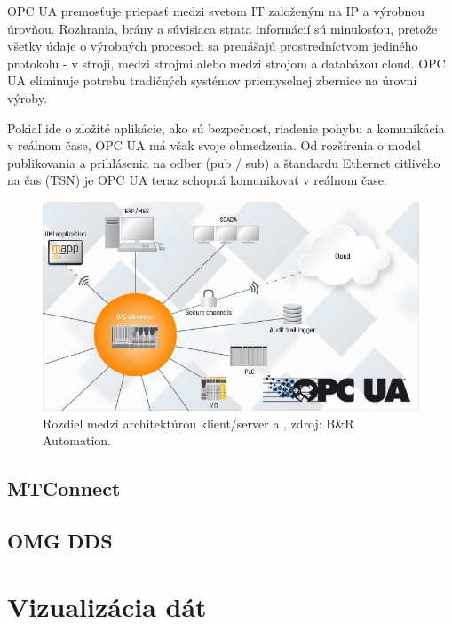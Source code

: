 \documentclass[]{tukediphc}
\begin{document}
OPC UA premosťuje priepasť medzi svetom IT založeným na IP a výrobnou úrovňou. Rozhrania, brány a súvisiaca strata informácií sú minulosťou, pretože všetky údaje o výrobných procesoch sa prenášajú prostredníctvom jediného protokolu - v stroji, medzi strojmi alebo medzi strojom a databázou cloud. OPC UA eliminuje potrebu tradičných systémov priemyselnej zbernice na úrovni výroby.


Pokiaľ ide o zložité aplikácie, ako sú bezpečnosť, riadenie pohybu a komunikácia v reálnom čase, OPC UA má však svoje obmedzenia. Od rozšírenia o model publikovania a prihlásenia na odber (pub / sub) a štandardu Ethernet citlivého na čas (TSN) je OPC UA teraz schopná komunikovať v reálnom čase.

\begin{figure}[h!]
	\centering
	\includegraphics[width=.9\textwidth,angle=0]{figures/opc-ua.jpg}
	\caption{Rozdiel medzi architektúrou klient/server a , zdroj: B\&R Automation.}
\end{figure}

\subsection{MTConnect}

\subsection{OMG DDS}

\section{Vizualizácia dát}
\end{document}
